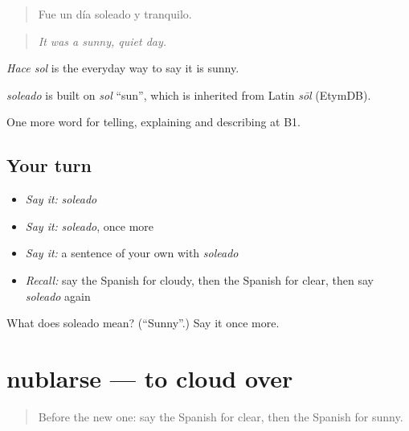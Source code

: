 \begin{quote}
Fue un día soleado y tranquilo.
\end{quote}

\begin{quote}
\emph{It was a sunny, quiet day.}
\end{quote}

\emph{Hace sol} is the everyday way to say it is sunny.

\begin{cousinweb}
\emph{soleado} is built on \emph{sol} \textquotedblleft{}sun\textquotedblright{}, which is inherited from Latin \emph{sōl} (EtymDB).
\end{cousinweb}

\begin{grammarlens}[title={What you've built}]
One more word for telling, explaining and describing at B1.
\end{grammarlens}

\subsection*{Your turn}
\begin{itemize}
\raggedright
  \item \emph{Say it:} \emph{soleado}
  \item \emph{Say it:} \emph{soleado}, once more
  \item \emph{Say it:} a sentence of your own with \emph{soleado}
  \item \emph{Recall:} say the Spanish for cloudy, then the Spanish for clear, then say \emph{soleado} again
\end{itemize}

\begin{tcolorbox}[breakable,colback=teal!4,colframe=teal!35!black,title={Before you move on}]
What does soleado mean? (\textquotedblleft{}Sunny\textquotedblright{}.) Say it once more.
\end{tcolorbox}
\section[nublarse]{nublarse — to cloud over}

\label{lesson:ES-C698-nublarse}



\begin{quote}
Before the new one: say the Spanish for clear, then the Spanish for sunny.
\end{quote}

